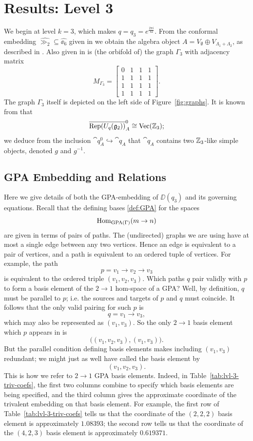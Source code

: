 \section{Results: Level 3}

We begin at level $k=3$, which makes $q=q_3=e^{\frac{2\pi i}{42}}$. From the conformal embedding $\hat{\gg_2}\subseteq\hat{\ee_6}$ given in \cite{DMNO} we obtain the algebra object $A=V_{\emptyset} \oplus V_{\Lambda_1+\Lambda_2}$, as described in \cite{g2_graphs}. Also given in \cite{g2_graphs} is (the orbifold of) the graph $\Gamma_3$ with adjacency matrix
\[
    M_{\Gamma_3} = \begin{bmatrix} 0&1&1&1\\ 1&1&1&1\\ 1&1&1&1\\ 1&1&1&1\end{bmatrix}.
\]
The graph $\Gamma_3$ itself is depicted on the left side of Figure~\ref{fig:graphs}.
It is known from \cite{DMNO} that 
\[
    \overline{\operatorname{Rep}(U_{q}(\mathfrak{g}_2))}_A^0\cong \operatorname{Vec}(\mathbb{Z}_3);
\]
we deduce from the inclusion $\cat{q}_A^0 \hookrightarrow \cat{q}_A$ that $\cat{q}_A$ contains two $\mathbb{Z}_3$-like simple objects, denoted $g$ and $g^{-1}$. 



\subsection{GPA Embedding and Relations}
Here we give details of both the GPA-embedding of $\DD(q_3)$ and its governing equations. 
Recall that the defining bases \ref{def:GPA} for the spaces 
\[
    \operatorname{Hom}_{\operatorname{GPA}(\Gamma)}(m\to n)
\]
are given in terms of pairs of paths. 
The (undirected) graphs we are using have at most a single edge between any two vertices. 
Hence an edge is equivalent to a pair of vertices, and a path is equivalent to an ordered tuple of vertices. 
For example, the path
\[
    p = v_1 \longrightarrow v_2 \longrightarrow v_3
\]
is equivalent to the ordered triple $(v_1,v_2,v_3)$. 
Which paths $q$ pair validly with $p$ to form a basis element of the $2\to 1$ hom-space of a GPA? 
Well, by definition, $q$ must be parallel to $p$; i.e. the sources and targets of $p$ and $q$ must coincide. 
It follows that the only valid pairing for such $p$ is
\[
    q = v_1 \longrightarrow v_3,
\]
which may also be represented as $(v_1,v_3)$. 
So the only $2\to 1$ basis element which $p$ appears in is
\[
    \big( (v_1,v_2,v_3), (v_1,v_3) \big).
\]
But the parallel condition defining basis elements makes including $(v_1,v_3)$ redundant; we might just as well have called the basis element by 
\[
    (v_1,v_2,v_3).
\]
This is how we refer to $2\to 1$ GPA basis elements. 
Indeed, in Table~\ref{tab:lvl-3-triv-coefs}, the first two columns combine to specify which basis elements are being specified, and the third column gives the approximate coordinate of the trivalent embedding on that basis element. 
For example, the first row of Table~\ref{tab:lvl-3-triv-coefs} tells us that the coordinate of the $(2,2,2)$ basis element is approximately $1.08393$; the second row tells us that the coordinate of the $(4,2,3)$ basis element is approximately $0.619371$. 

